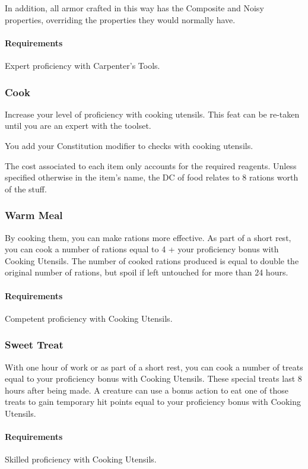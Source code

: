     In addition, all armor crafted in this way has the Composite and Noisy properties, overriding the properties they would normally have.
    \paragraph{Requirements} Expert proficiency with Carpenter's Tools.

\subsubsection{Cook} \label{feat::cook}
    Increase your level of proficiency with cooking utensils.
    This feat can be re-taken until you are an expert with the toolset.

    You add your Constitution modifier to checks with cooking utensils.

    The cost associated to each item only accounts for the required reagents.
    Unless specified otherwise in the item's name, the DC of food relates to 8 rations worth of the stuff.
\subsubsection{Warm Meal} \label{feat::warmmeal}
    By cooking them, you can make rations more effective.
    As part of a short rest, you can cook a number of rations equal to 4 + your proficiency bonus with Cooking Utensils.
    The number of cooked rations produced is equal to double the original number of rations, but spoil if left untouched for more than 24 hours.
    \paragraph{Requirements} Competent proficiency with Cooking Utensils.
\subsubsection{Sweet Treat} \label{feat::sweettreat}
    With one hour of work or as part of a short rest, you can cook a number of treats equal to your proficiency bonus with Cooking Utensils.
    These special treats last 8 hours after being made.
    A creature can use a bonus action to eat one of those treats to gain temporary hit points equal to your proficiency bonus with Cooking Utensils.
    \paragraph{Requirements} Skilled proficiency with Cooking Utensils.
